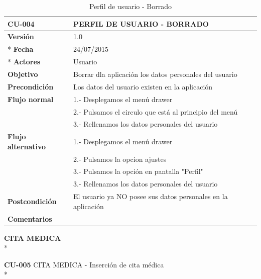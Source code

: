 \documentclass[../pfc.tex]{subfiles}
\begin{document}
	\begin{table}[H]
		\centering
		\begin{tabular}[t]{|p{3cm}|p{9.5cm}|}
			\hline \textbf{CU-004} & \textbf{PERFIL DE USUARIO - BORRADO} \\*
			\hline\hline \textbf{Versión} & 1.0 \\ *
			\hline\hline \textbf{Fecha} & 24/07/2015 \\ *
			\hline\textbf{Actores} 	& Usuario\\*
			\hline \textbf{Objetivo} & Borrar dla aplicación los datos personales del usuario\\* 			
			\hline \textbf{Precondición} & Los datos del usuario existen en la aplicación \\* 
			\hline \textbf{Flujo normal} & 1.- Desplegamos el menú drawer \\* 
			& 2.- Pulsamos el circulo que está al principio del menú \\*	
			& 3.- Rellenamos los datos personales del usuario\\*	
			\hline \textbf{Flujo alternativo} & 1.- Desplegamos el menú drawer \\* 
			& 2.- Pulsamos la opcion ajustes \\*	
			& 3.- Pulsamos la opción en pantalla "Perfil" \\*	
			& 3.- Rellenamos los datos personales del usuario \\*	
			\hline \textbf{Postcondición} & El usuario ya NO posee sus datos personales en la aplicación \\* 
			\hline \textbf{Comentarios}   &  \\*
			\hline
		\end{tabular}
		\caption{Perfil de usuario - Borrado}
		\label{tabla:caso004}

	\end{table}
	
	
	
	
	
	
	\textbf{CITA MEDICA}\\*

	\textbf{CU-005}	CITA MEDICA - Inserción de cita médica\\*
	
\end{document}
